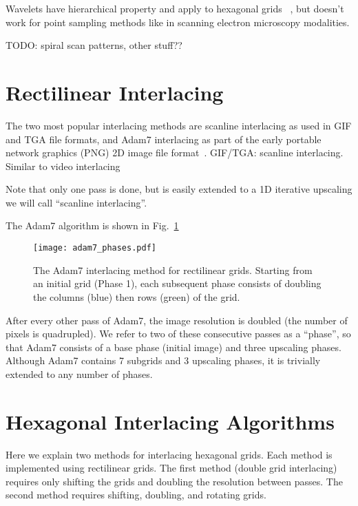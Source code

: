 \documentclass{article}
\newcommand{\reffig}[1]{Fig.~\ref{fig:#1}}
\begin{document}
Wavelets have hierarchical property and apply to hexagonal grids~ \citep{jeevan2014compression}
, but doesn't work for point sampling methods
like in scanning electron microscopy modalities.

TODO: spiral scan patterns, other stuff??


\section{Rectilinear Interlacing}
\label{sec:rect}

The two most popular interlacing methods are scanline interlacing as used in GIF and TGA file formats, and Adam7 interlacing as part of the early portable network graphics (PNG) 2D image file format~\citep{rfc2083}.
%
GIF/TGA: scanline interlacing. Similar to video interlacing

%
Note that only one pass is done, but is easily extended to a 1D iterative upscaling we will call ``scanline interlacing''.


The Adam7 algorithm is shown in \reffig{adam7phases}


\begin{figure}[ht]
\centering
\texttt{[image: adam7\_phases.pdf]}
\caption{\label{fig:adam7phases}
The Adam7 interlacing method for rectilinear grids.
%
	Starting from an initial grid (Phase 1), each subsequent phase consists of doubling the columns (blue) then rows (green) of the grid.
	}
\end{figure}


After every other pass of Adam7, the image resolution is doubled (the number of pixels is quadrupled).
%
We refer to two of these consecutive passes as a ``phase'', so that Adam7 consists of a base phase (initial image) and three upscaling phases.
%
Although Adam7 contains 7 subgrids and 3 upscaling phases, it is trivially extended to any number of phases.


\section{Hexagonal Interlacing Algorithms}
\label{sec:hexinter}

Here we explain two methods for interlacing hexagonal grids.
%
Each method is implemented using rectilinear grids.
%
The first method (double grid interlacing) requires only shifting the grids and doubling the resolution between passes.
%
The second method requires shifting, doubling, and rotating grids.
\end{document}
